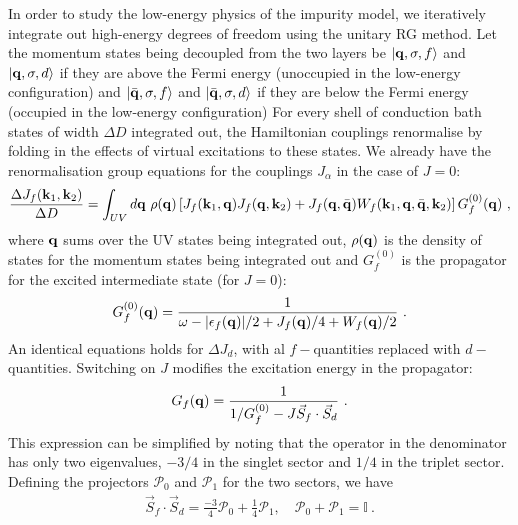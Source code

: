 \documentclass[%
reprint,
superscriptaddress,
groupedaddress,
superscriptaddress,
onecolumn,
10pt
]{revtex4-2}
\begin{document}
In order to study the low-energy physics of the impurity model, we iteratively integrate out high-energy degrees of freedom using the unitary RG method. Let the momentum states being decoupled from the two layers be \(\ket{{\bf q},\sigma,f}\) and \(\ket{{\bf q},\sigma,d}\) if they are above the Fermi energy (unoccupied in the low-energy configuration) and \(\ket{\bar{\bf q},\sigma,f}\) and \(\ket{\bar{\bf q},\sigma,d}\) if they are below the Fermi energy (occupied in the low-energy configuration)
For every shell of conduction bath states of width \(\Delta D\) integrated out, the Hamiltonian couplings renormalise by folding in the effects of virtual excitations to these states. We already have the renormalisation group equations for the couplings \(J_\alpha\) in the case of \(J=0\):
\begin{equation}\begin{aligned}
	\frac{\Delta J_f({\bf k}_1, {\bf k}_2)}{\Delta D} = \int_{UV} d{\bf q} ~\rho({\bf q}) \left[J_f({\bf k}_1, {\bf q})J_f({\bf q}, {\bf k}_2) + J_f({\bf q}, \bar {\bf q})W_f({\bf k}_1, {\bf q}, \bar {\bf q}, {\bf k}_2)\right] G_f^{(0)}({\bf q})~,
\end{aligned}\end{equation}
where \({\bf q}\) sums over the UV states being integrated out, \(\rho({\bf q})\) is the density of states for the momentum states being integrated out and \(G_f^{(0)}\) is the propagator for the excited intermediate state (for \(J=0\)):
\begin{equation}\begin{aligned}
	G_f^{(0)}({\bf q}) = \frac{1}{\omega - |\epsilon_f({\bf q})| / 2 + J_f({\bf q}) / 4 + W_f({\bf q}) / 2}~.
\end{aligned}\end{equation}
An identical equations holds for \(\Delta J_d\), with al \(f-\)quantities replaced with \(d-\)quantities. Switching on \(J\) modifies the excitation energy in the propagator:
\begin{equation}\begin{aligned}
	G_f({\bf q}) = \frac{1}{1/G_f^{(0)} - J \vec{S}_f\cdot\vec{S}_d}~.
\end{aligned}\end{equation}
This expression can be simplified by noting that the operator in the denominator has only two eigenvalues, \(-3/4\) in the singlet sector and \(1/4\) in the triplet sector. Defining the projectors \(\mathcal{P}_0\) and \(\mathcal{P}_1\) for the two sectors, we have
\begin{equation}\begin{aligned}
	\vec{S}_f\cdot\vec{S}_d = \frac{-3}{4}\mathcal{P}_0 + \frac{1}{4}\mathcal{P}_1, \quad \mathcal{P}_0 + \mathcal{P}_1 = \mathbb{I}~.
\end{aligned}\end{equation}
\end{document}
